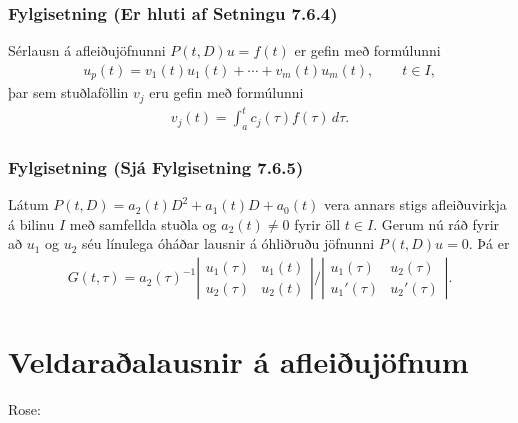 \documentclass[a4paper,10pt,icelandic]{sphinxmanual}
\begin{document}
\subsection{Fylgisetning (Er hluti af Setningu 7.6.4)}
\label{\detokenize{Kafli07:fylgisetning-er-hluti-af-setningu-7-6-4}}
Sérlausn á afleiðujöfnunni \(P(t,D)u=f(t)\) er gefin með formúlunni
\begin{equation*}
\begin{split}u_p(t)=v_1(t)u_1(t)+\cdots+v_m(t)u_m(t), \qquad  t\in I,\end{split}
\end{equation*}
þar sem stuðlaföllin \(v_j\) eru gefin með formúlunni
\begin{equation*}
\begin{split}v_j(t)=\int_a^t c_j(\tau)f(\tau) \, d\tau.\end{split}
\end{equation*}

\subsection{Fylgisetning (Sjá Fylgisetning 7.6.5)}
\label{\detokenize{Kafli07:fylgisetning-sja-fylgisetning-7-6-5}}
Látum \(P(t,D)=a_2(t)D^2+a_1(t)D+a_0(t)\) vera annars stigs afleiðuvirkja á bilinu \(I\) með samfellda stuðla og \(a_2(t)\neq 0\) fyrir öll \(t\in I\). Gerum nú ráð fyrir að \(u_1\) og \(u_2\) séu línulega óháðar lausnir á óhliðruðu jöfnunni \(P(t,D)u=0\). Þá er
\begin{equation*}
\begin{split}G(t,\tau)
=a_2(\tau)^{-1}
\left|\begin{matrix}
u_1(\tau) & u_1(t)\\
u_2(\tau) & u_2(t)
\end{matrix}\right|\bigg /
\left|\begin{matrix}
u_1(\tau) & u_2({\tau})\\
u_1'(\tau) & u_2'({\tau})
\end{matrix}\right|.\end{split}
\end{equation*}

\chapter{Veldaraðalausnir á afleiðujöfnum}
\label{\detokenize{Kafli08:veldaraalausnir-a-afleiujofnum}}\label{\detokenize{Kafli08::doc}}
Rose: 
\end{document}
